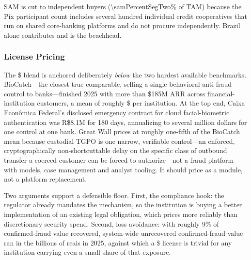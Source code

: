 \noindent SAM is cut to \numint{\samSegTwoInstitutions} independent buyers
(\num[round-precision=1]{\samPercentSegTwo}\% of TAM) because the Pix participant
count includes several hundred individual credit cooperatives that run on shared
core-banking platforms and do not procure independently. Brazil alone contributes
\numint{\samSegTwoInstBrazil} and is the beachhead.


\subsubsection*{License Pricing}

The \$\numint{\arpuSegTwoAnnualLicence} blend is anchored deliberately \emph{below}
the two hardest available benchmarks. BioCatch---the closest true comparable, selling
a single behavioral anti-fraud control to banks---finished 2025 with more than
\$185M ARR across  financial-institution customers, a mean of roughly
\$ per institution\cite{biocatch2026}. At the top end, Caixa
Econ\^{o}mica Federal's disclosed emergency contract for cloud facial-biometric
authentication was R\$\num[round-precision=1]{8.1}M for 180
days\cite{caixa2026biometria}, annualizing to several million dollars for one control
at one bank. Great Wall prices at roughly one-fifth of the BioCatch mean because
custodial TGPO is one narrow, verifiable control---an enforced,
cryptographically non-shortcuttable delay on the specific class of outbound transfer a
coerced customer can be forced to authorize---not a fraud platform with models, case
management and analyst tooling. It should price as a module, not a platform
replacement.

Two arguments support a defensible floor. First, the compliance hook: the regulator
already mandates the mechanism\cite{bcb2021res142}, so the institution is buying a
better implementation of an existing legal obligation, which prices more reliably
than discretionary security spend. Second, loss avoidance: with roughly
\num[round-precision=0]{9}\% of confirmed-fraud value recovered\cite{bcb2026med},
system-wide unrecovered confirmed-fraud value ran in the billions of reais in 2025,
against which a \$\numint{\arpuSegTwoAnnualLicence} license is trivial for any
institution carrying even a small share of that exposure.

